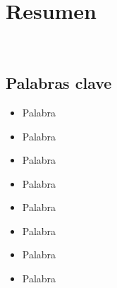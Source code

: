\chapter*{Resumen}\label{ch:abstract-es}

\lipsum[1-2] \\

\section*{Palabras clave}\label{sec:keywords-es}
\begin{multicols}{2}
    \begin{itemize}
        \item Palabra
        \item Palabra
        \item Palabra
        \item Palabra
    \end{itemize}
    \columnbreak
    \begin{itemize}
        \item Palabra
        \item Palabra
        \item Palabra
        \item Palabra
    \end{itemize}
\end{multicols}